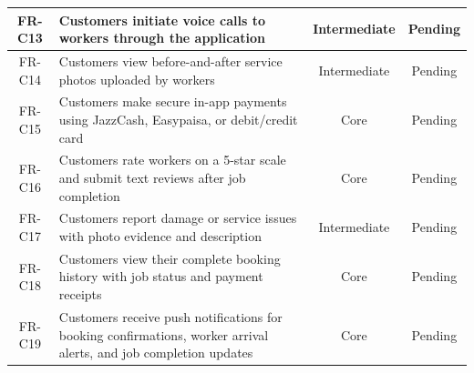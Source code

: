 \documentclass[12pt,a4paper]{report}
\begin{document}
\begin{longtable}{|c|p{9.5cm}|c|c|}
\hline
FR-C13 & Customers initiate voice calls to workers through the application & Intermediate & Pending \\
\hline
FR-C14 & Customers view before-and-after service photos uploaded by workers & Intermediate & Pending \\
\hline
FR-C15 & Customers make secure in-app payments using JazzCash, Easypaisa, or debit/credit card & Core & Pending \\
\hline
FR-C16 & Customers rate workers on a 5-star scale and submit text reviews after job completion & Core & Pending \\
\hline
FR-C17 & Customers report damage or service issues with photo evidence and description & Intermediate & Pending \\
\hline
FR-C18 & Customers view their complete booking history with job status and payment receipts & Core & Pending \\
\hline
FR-C19 & Customers receive push notifications for booking confirmations, worker arrival alerts, and job completion updates & Core & Pending \\
\hline


\end{longtable}
\end{document}
